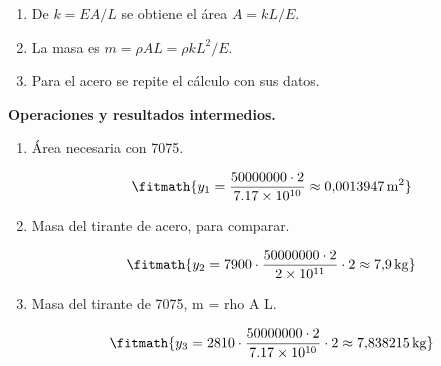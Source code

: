 \begin{enumerate}

\item De $k = EA/L$ se obtiene el área $A = kL/E$.

\item La masa es $m = \rho A L = \rho k L^{2}/E$.

\item Para el acero se repite el cálculo con sus datos.

\end{enumerate}

\noindent\textbf{Operaciones y resultados intermedios.}

\begin{enumerate}

\item Área necesaria con 7075.

\[\fitmath{y_{1}=\frac{50000000\cdot 2}{7.17\times10^{10}}\approx 0{,}0013947\,\mathrm{m^{2}}}\]

\item Masa del tirante de acero, para comparar.

\[\fitmath{y_{2}=7900\cdot \frac{50000000\cdot 2}{2\times10^{11}}\cdot 2\approx 7{,}9\,\mathrm{kg}}\]

\item Masa del tirante de 7075, m = rho A L.

\[\fitmath{y_{3}=2810\cdot \frac{50000000\cdot 2}{7.17\times10^{10}}\cdot 2\approx 7{,}838215\,\mathrm{kg}}\]

\end{enumerate}
